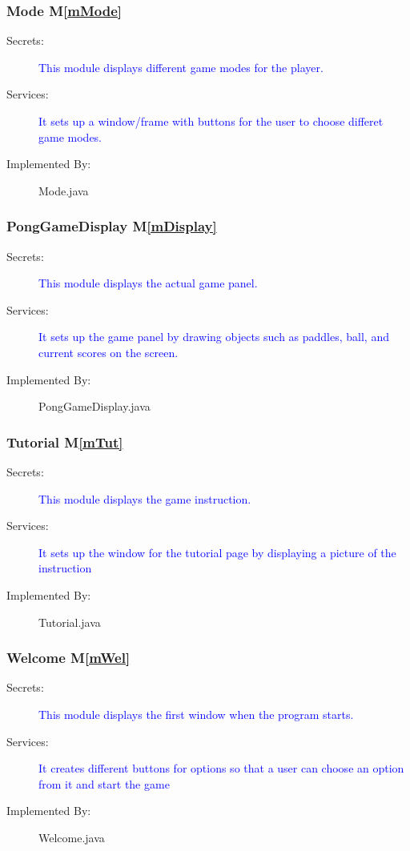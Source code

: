 \documentclass[12pt,letterpaper]{article}
\begin{document}
	\subsubsection{Mode M\ref{mMode}}
\begin{description} 
	\item[Secrets: ] \textcolor{blue}{This module displays different game modes for the player.}
	\item[Services: ] \textcolor{blue} {It sets up a window/frame with buttons for the user to choose differet game modes.}
	\item[Implemented By: ] Mode.java
\end{description}

	\subsubsection{PongGameDisplay M\ref{mDisplay}}
\begin{description} 
	\item[Secrets: ] \textcolor{blue}{This module displays the actual game panel.}
	\item[Services: ] \textcolor{blue} {It sets up the game panel by drawing objects such as paddles, ball, and current scores on the screen.}
	\item[Implemented By: ] PongGameDisplay.java
\end{description}

	\subsubsection{Tutorial M\ref{mTut}}
\begin{description} 
	\item[Secrets: ] \textcolor{blue}{This module displays the game instruction.}
	\item[Services: ] \textcolor{blue} {It sets up the window for the tutorial page by displaying a picture of the instruction}
	\item[Implemented By: ] Tutorial.java
\end{description}

	\subsubsection{Welcome M\ref{mWel}}
\begin{description} 
	\item[Secrets: ] \textcolor{blue}{This module displays the first window when the program starts.}
	\item[Services: ] \textcolor{blue} {It creates different buttons for options so that a user can choose an option from it and start the game}
	\item[Implemented By: ] Welcome.java
\end{description}
\end{document}

